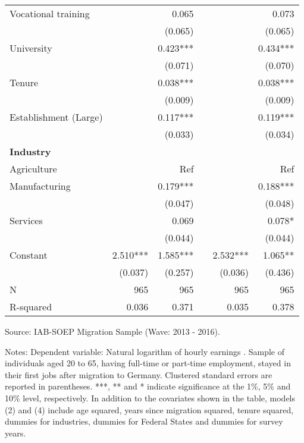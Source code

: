 \documentclass[12pt,a4paper]{article}
\begin{document}
\begin{table}[htbp]
{\begin{tabular}{lrrrrr}
    \multicolumn{1}{p{8.65em}}{Vocational training} &       & 0.065 &       &       & 0.073 \\
    \multicolumn{1}{p{8.65em}}{                         } &       & (0.065) &       &       & (0.065) \\
    \multicolumn{1}{p{8.65em}}{University} &       & 0.423*** &       &       & 0.434*** \\
                              &       & (0.071) &       &       & (0.070) \\
    Tenure &       & 0.038*** &       &       & 0.038*** \\
                              &       & (0.009) &       &       & (0.009) \\
    \multicolumn{1}{p{14em}}{Establishment (Large)} &       & 0.117*** &       &       & 0.119*** \\
                              &       & (0.033) &       &       & (0.034) \\
    \multicolumn{1}{p{8.65em}}{\textbf{Industry}} &       &       &       &       &  \\
    \multicolumn{1}{p{8.65em}}{Agriculture} &       & Ref   &       &       & Ref \\
    \multicolumn{1}{p{8.65em}}{Manufacturing} &       & 0.179*** &       &       & 0.188*** \\
          &       & (0.047) &       &       & (0.048) \\
    \multicolumn{1}{p{8.65em}}{Services} &       & 0.069 &       &       & 0.078* \\
                              &       & (0.044) &       &       & (0.044) \\
    Constant                  & 2.510*** & 1.585*** &       & 2.532*** & 1.065** \\
                              & (0.037) & (0.257) &       & (0.036) & (0.436) \\
    N                         &            965    &         965    &       &            965    &          965    \\
    R-squared                 & 0.036 & 0.371 &       & 0.035 & 0.378 \\
    \bottomrule
    \end{tabular}%
}


\begin{tablenotes}
      \small
      \item Source: IAB-SOEP Migration Sample (Wave: 2013 - 2016).
      \item Notes: Dependent variable: Natural logarithm of hourly earnings . Sample of individuals aged 20 to 65, having full-time or part-time employment, stayed in their first jobs after migration to Germany. Clustered standard errors are reported in parentheses.  ***, ** and * indicate significance at the 1\%, 5\% and 10\% level, respectively. In addition to the covariates shown in the table, models (2) and (4) include age squared, years since migration squared, tenure squared, dummies for industries, dummies for Federal States and dummies for survey years.
    \end{tablenotes}
\end{table}%
\end{document}
